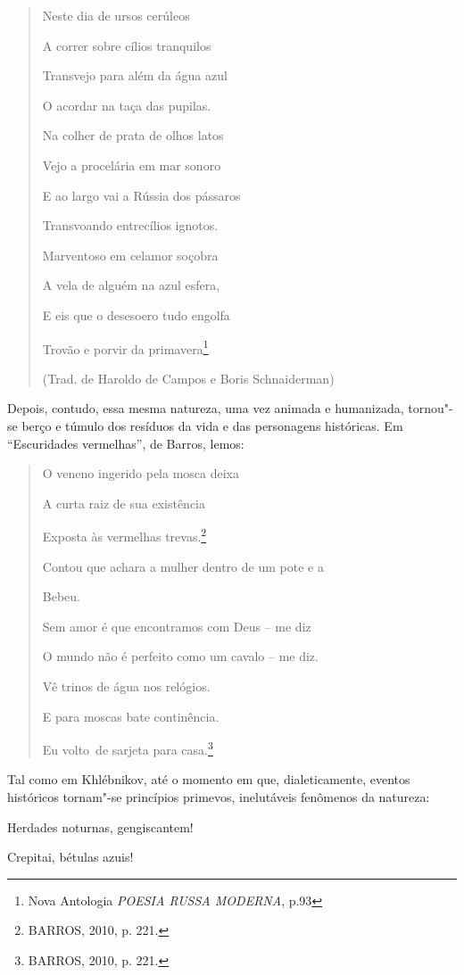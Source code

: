 \begin{quote}
Neste dia de ursos cerúleos

A correr sobre cílios tranquilos

Transvejo para além da água azul

O acordar na taça das pupilas.

Na colher de prata de olhos latos

Vejo a procelária em mar sonoro

E ao largo vai a Rússia dos pássaros

Transvoando entrecílios ignotos.

Marventoso em celamor soçobra

A vela de alguém na azul esfera,

E eis que o desesoero tudo engolfa

Trovão e porvir da primavera\footnote{Nova Antologia \emph{POESIA RUSSA
  MODERNA}, p.93}

(Trad. de Haroldo de Campos e Boris Schnaiderman)
\end{quote}

Depois, contudo, essa mesma natureza, uma vez animada e humanizada,
tornou"-se berço e túmulo dos resíduos da vida e das personagens
históricas. Em ``Escuridades vermelhas'', de Barros, lemos:

\begin{quote}
O veneno ingerido pela mosca deixa

A curta raiz de sua existência

Exposta às vermelhas trevas.\footnote{BARROS, 2010, p. 221.}

Contou que achara a mulher dentro de um pote e a

Bebeu.

Sem amor é que encontramos com Deus -- me diz

O mundo não é perfeito como um cavalo -- me diz.

Vê trinos de água nos relógios.

E para moscas bate continência.

Eu volto~de sarjeta para casa.\footnote{BARROS, 2010, p. 221.}
\end{quote}

Tal como em Khlébnikov, até o momento em que, dialeticamente, eventos
históricos tornam"-se princípios primevos, inelutáveis fenômenos da
natureza:

Herdades noturnas, gengiscantem!

Crepitai, bétulas azuis!

